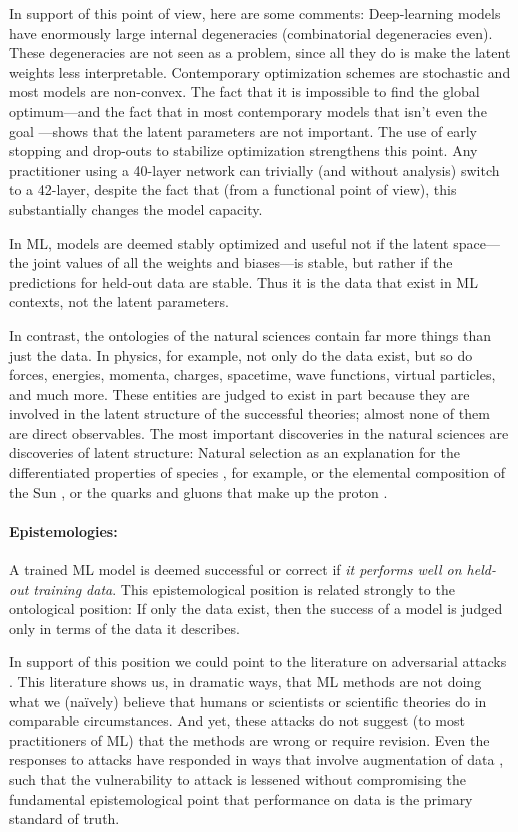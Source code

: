 \documentclass[11pt]{article}
\begin{document}
In support of this point of view, here are some comments:
Deep-learning models have enormously large internal degeneracies (combinatorial degeneracies even).
These degeneracies are not seen as a problem, since all they do is make the latent weights less interpretable.
Contemporary optimization schemes are stochastic \cite{stochastic} and most models are non-convex.
The fact that it is impossible to find the global optimum---and the fact that in most contemporary models that isn't even the goal \cite{not_global}---shows that the latent parameters are not important.
The use of early stopping \cite{early_stop} and drop-outs \cite{dropout} to stabilize optimization strengthens this point.
Any practitioner using a 40-layer network can trivially (and without analysis) switch to a 42-layer, despite the fact that (from a functional point of view), this substantially changes the model capacity.

In ML, models are deemed stably optimized and useful not if the latent space---the joint values of all the weights and biases---is stable, but rather if the predictions for held-out data are stable.
Thus it is the data that exist in ML contexts, not the latent parameters.

In contrast, the ontologies of the natural sciences contain far more things than just the data.
In physics, for example, 
not only do the data exist, but so do forces, energies, momenta, charges, spacetime, wave functions, virtual particles, and much more.
These entities are judged to exist in part because they are involved in the latent structure of the successful theories; almost none of them are direct observables.
The most important discoveries in the natural sciences are discoveries of latent structure: Natural selection as an explanation for the differentiated properties of species \cite{natural_selection}, for example, or the elemental composition of the Sun \cite{sun_composition}, or the quarks and gluons that make up the proton \cite{proton_substructure}.

\paragraph{Epistemologies:}
A trained ML model is deemed successful or correct if \emph{it performs well on held-out training data}.
This epistemological position is related strongly to the ontological position:
If only the data exist, then the success of a model is judged only in terms of the data it describes.

In support of this position we could point to the literature on adversarial attacks \cite{adversarial1, adversarial2}.
This literature shows us, in dramatic ways, that ML methods are not doing what we (na\"ively) believe that humans or scientists or scientific theories do in comparable circumstances.
And yet, these attacks do not suggest (to most practitioners of ML) that the methods are wrong or require revision.
Even the responses to attacks have responded in ways that involve augmentation of data \cite{adversarial_training}, such that the vulnerability to attack is lessened without compromising the fundamental epistemological point that performance on data is the primary standard of truth.
\end{document}
